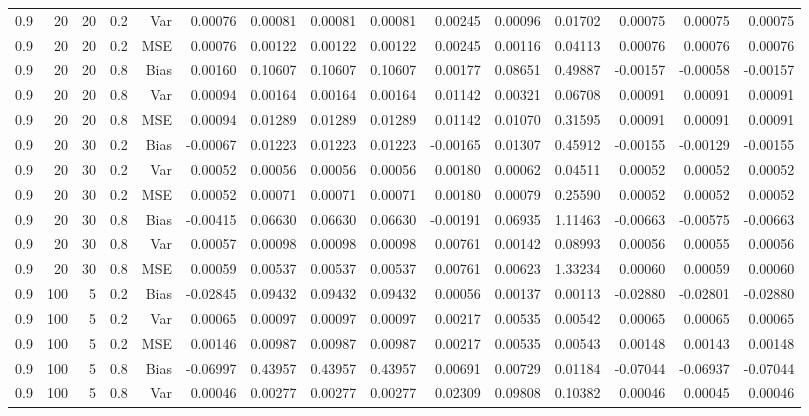 \begin{table}[!htbp]
\begin{tabular}{lrrrrrrrrrrrrrr}
0.9 &  20 & 20 & 0.2 & Var & 0.00076 & 0.00081 & 0.00081 & 0.00081 & 0.00245 & 0.00096 & 0.01702 & 0.00075 & 0.00075 & 0.00075 \\
0.9 &  20 & 20 & 0.2 & MSE & 0.00076 & 0.00122 & 0.00122 & 0.00122 & 0.00245 & 0.00116 & 0.04113 & 0.00076 & 0.00076 & 0.00076 \\
0.9 &  20 & 20 & 0.8 & Bias & 0.00160 & 0.10607 & 0.10607 & 0.10607 & 0.00177 & 0.08651 & 0.49887 & -0.00157 & -0.00058 & -0.00157 \\
0.9 &  20 & 20 & 0.8 & Var & 0.00094 & 0.00164 & 0.00164 & 0.00164 & 0.01142 & 0.00321 & 0.06708 & 0.00091 & 0.00091 & 0.00091 \\
0.9 &  20 & 20 & 0.8 & MSE & 0.00094 & 0.01289 & 0.01289 & 0.01289 & 0.01142 & 0.01070 & 0.31595 & 0.00091 & 0.00091 & 0.00091 \\
0.9 &  20 & 30 & 0.2 & Bias & -0.00067 & 0.01223 & 0.01223 & 0.01223 & -0.00165 & 0.01307 & 0.45912 & -0.00155 & -0.00129 & -0.00155 \\
0.9 &  20 & 30 & 0.2 & Var & 0.00052 & 0.00056 & 0.00056 & 0.00056 & 0.00180 & 0.00062 & 0.04511 & 0.00052 & 0.00052 & 0.00052 \\
0.9 &  20 & 30 & 0.2 & MSE & 0.00052 & 0.00071 & 0.00071 & 0.00071 & 0.00180 & 0.00079 & 0.25590 & 0.00052 & 0.00052 & 0.00052 \\
0.9 &  20 & 30 & 0.8 & Bias & -0.00415 & 0.06630 & 0.06630 & 0.06630 & -0.00191 & 0.06935 & 1.11463 & -0.00663 & -0.00575 & -0.00663 \\
0.9 &  20 & 30 & 0.8 & Var & 0.00057 & 0.00098 & 0.00098 & 0.00098 & 0.00761 & 0.00142 & 0.08993 & 0.00056 & 0.00055 & 0.00056 \\
0.9 &  20 & 30 & 0.8 & MSE & 0.00059 & 0.00537 & 0.00537 & 0.00537 & 0.00761 & 0.00623 & 1.33234 & 0.00060 & 0.00059 & 0.00060 \\
0.9 & 100 &  5 & 0.2 & Bias & -0.02845 & 0.09432 & 0.09432 & 0.09432 & 0.00056 & 0.00137 & 0.00113 & -0.02880 & -0.02801 & -0.02880 \\
0.9 & 100 &  5 & 0.2 & Var & 0.00065 & 0.00097 & 0.00097 & 0.00097 & 0.00217 & 0.00535 & 0.00542 & 0.00065 & 0.00065 & 0.00065 \\
0.9 & 100 &  5 & 0.2 & MSE & 0.00146 & 0.00987 & 0.00987 & 0.00987 & 0.00217 & 0.00535 & 0.00543 & 0.00148 & 0.00143 & 0.00148 \\
0.9 & 100 &  5 & 0.8 & Bias & -0.06997 & 0.43957 & 0.43957 & 0.43957 & 0.00691 & 0.00729 & 0.01184 & -0.07044 & -0.06937 & -0.07044 \\
0.9 & 100 &  5 & 0.8 & Var & 0.00046 & 0.00277 & 0.00277 & 0.00277 & 0.02309 & 0.09808 & 0.10382 & 0.00046 & 0.00045 & 0.00046 \\

\end{tabular}
\end{table}
